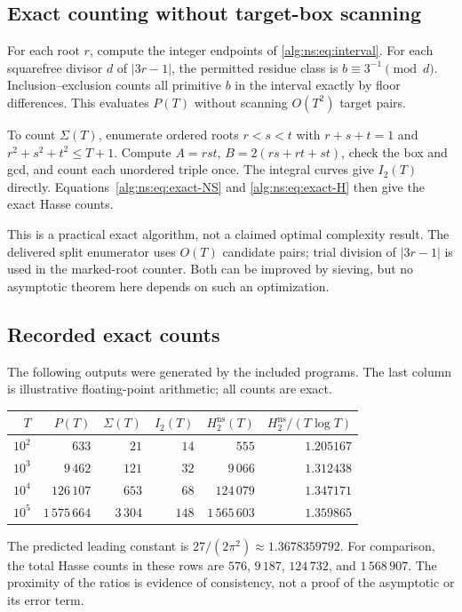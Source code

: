 \documentclass[11pt]{article}
\numberwithin{equation}{section}
\theoremstyle{plain}
\theoremstyle{plain}
\theoremstyle{plain}
\theoremstyle{definition}
\theoremstyle{definition}
\theoremstyle{definition}
\theoremstyle{remark}
\newcommand{\NS}{\mathrm{ns}}\newcommand{\spc}{\mathrm{sp}}
\begin{document}
\subsection{Exact counting without target-box scanning}
For each root $r$, compute the integer endpoints of \eqref{alg:ns:eq:interval}.
For each squarefree divisor $d$ of $|3r-1|$, the permitted residue class
is $b\equiv3^{-1}\pmod d$. Inclusion--exclusion counts all primitive
$b$ in the interval exactly by floor differences. This evaluates $P(T)$
without scanning $O(T^2)$ target pairs.

To count $\Sigma(T)$, enumerate ordered roots $r<s<t$ with $r+s+t=1$ and
$r^2+s^2+t^2\le T+1$. Compute $A=rst$, $B=2(rs+rt+st)$, check the box
and gcd, and count each unordered triple once. The integral curves give
$I_2(T)$ directly. Equations~\eqref{alg:ns:eq:exact-NS} and \eqref{alg:ns:eq:exact-H}
then give the exact Hasse counts.

This is a practical exact algorithm, not a claimed optimal complexity
result. The delivered split enumerator uses $O(T)$ candidate pairs;
trial division of $|3r-1|$ is used in the marked-root counter. Both can
be improved by sieving, but no asymptotic theorem here depends on such
an optimization.

\subsection{Recorded exact counts}
The following outputs were generated by the included programs. The last
column is illustrative floating-point arithmetic; all counts are exact.
\begin{center}\small
\begin{tabular}{@{}r r r r r r@{}}
\toprule
$T$ & $P(T)$ & $\Sigma(T)$ & $I_2(T)$ & $H_2^{\NS}(T)$ &
$H_2^{\NS}/(T\log T)$\\
\midrule
$10^2$ & $633$ & $21$ & $14$ & $555$ & $1.205167$\\
$10^3$ & $9\,462$ & $121$ & $32$ & $9\,066$ & $1.312438$\\
$10^4$ & $126\,107$ & $653$ & $68$ & $124\,079$ & $1.347171$\\
$10^5$ & $1\,575\,664$ & $3\,304$ & $148$ & $1\,565\,603$ & $1.359865$\\
\bottomrule
\end{tabular}
\end{center}
The predicted leading constant is
$27/(2\pi^2)\approx1.3678359792$.
For comparison, the total Hasse counts in these rows are
$576$, $9\,187$, $124\,732$, and $1\,568\,907$.
The proximity of the ratios is evidence of consistency, not a proof of
the asymptotic or its error term.
\end{document}
